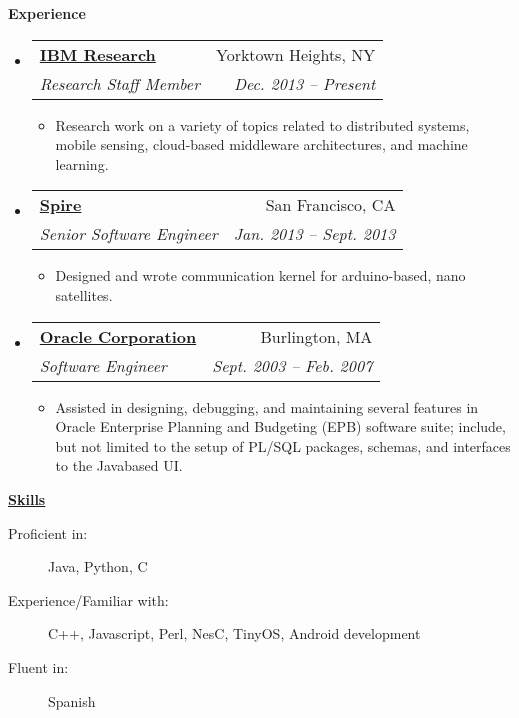 \documentclass[letterpaper,11pt]{article}
\makeatletter
\newcommand{\resitem}[1]{\item #1 \vspace{-2pt}}
\newcommand{\resheading}[1]{{\large \colorbox{mygrey}{\begin{minipage}{\textwidth}{\textbf{#1 \vphantom{p\^{E}}}}\end{minipage}}}}
\newcommand{\ressubheading}[4]{
\begin{tabular*}{6.5in}{l@{\extracolsep{\fill}}r}
		\textbf{#1} & #2 \\
		\textit{#3} & \textit{#4} \\
\end{tabular*}\vspace{-6pt}}
\makeatother
\begin{document}
\resheading{Experience}
	\begin{itemize}

        \item 
			\ressubheading{\href{http://www.research.ibm.com/}{IBM Research}}{Yorktown Heights, NY}
				{Research Staff Member}{Dec. 2013 -- Present}
				{ \footnotesize
				\begin{itemize}
                    \resitem{Research work on a variety of topics related to distributed systems, mobile sensing, cloud-based middleware architectures, and machine learning. }
				\end{itemize}
				}


        \item 
			\ressubheading{\href{https://spire.com/}{Spire}}{San Francisco, CA}
				{Senior Software Engineer}{Jan. 2013 -- Sept. 2013}
				{ \footnotesize
				\begin{itemize}
                    \resitem{Designed and wrote communication kernel for arduino-based, nano satellites.}
				\end{itemize}
				}

		\item 
			\ressubheading{\href{http://www.oracle.com}{Oracle Corporation}}{Burlington, MA}
				{Software Engineer}{Sept. 2003 -- Feb. 2007}
				{ \footnotesize
				\begin{itemize}
                    \resitem{Assisted in designing, debugging, and maintaining several features in Oracle Enterprise Planning and Budgeting (EPB) software suite; include, but not limited to the setup of PL/SQL packages, schemas, and interfaces to the Java\-based UI.}
				\end{itemize}
				}

				
		
\end{itemize}  %

\resheading{\href{}{Skills}}
	\begin{description}
		\item[Proficient in:]{Java, Python, C
		}
		\item[Experience/Familiar with:]{ 
            C++, Javascript, Perl, NesC, TinyOS, Android development
		}
        \item[Fluent in:] { 
            Spanish
		}
	\end{description} %
\end{document}
